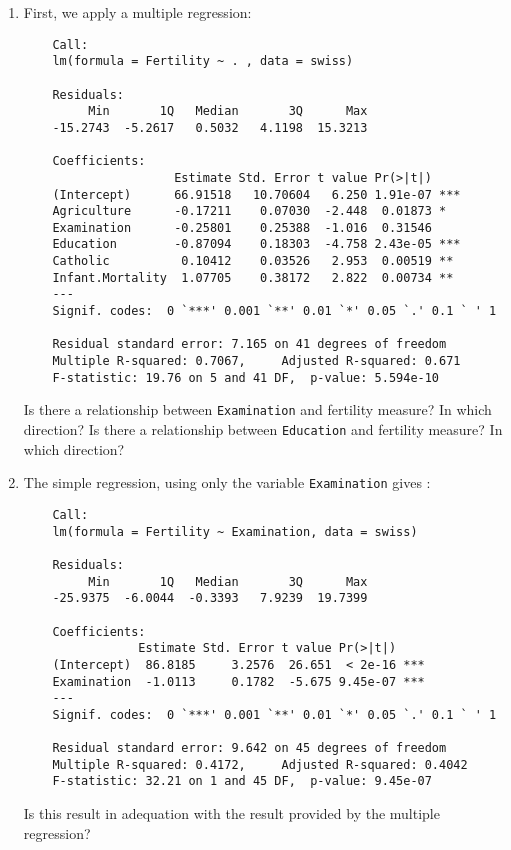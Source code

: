 \documentclass[12pt]{article}
\begin{document}
\begin{enumerate}

\item First, we apply a multiple regression: 

	\begin{verbatim}
	Call:
	lm(formula = Fertility ~ . , data = swiss)
	
	Residuals:
	     Min       1Q   Median       3Q      Max 
	-15.2743  -5.2617   0.5032   4.1198  15.3213 
	
	Coefficients:
	                 Estimate Std. Error t value Pr(>|t|)    
	(Intercept)      66.91518   10.70604   6.250 1.91e-07 ***
	Agriculture      -0.17211    0.07030  -2.448  0.01873 *  
	Examination      -0.25801    0.25388  -1.016  0.31546    
	Education        -0.87094    0.18303  -4.758 2.43e-05 ***
	Catholic          0.10412    0.03526   2.953  0.00519 ** 
	Infant.Mortality  1.07705    0.38172   2.822  0.00734 ** 
	---
	Signif. codes:  0 `***' 0.001 `**' 0.01 `*' 0.05 `.' 0.1 ` ' 1 
	
	Residual standard error: 7.165 on 41 degrees of freedom
	Multiple R-squared: 0.7067,     Adjusted R-squared: 0.671 
	F-statistic: 19.76 on 5 and 41 DF,  p-value: 5.594e-10
	\end{verbatim}
	

	
Is there a relationship between \texttt{Examination} and  fertility measure? In which direction?
Is there a relationship between \texttt{Education} and  fertility measure? In which direction?


\item The simple regression, using only the variable  \texttt{Examination} gives :

	\begin{verbatim}
	Call:
	lm(formula = Fertility ~ Examination, data = swiss)
	
	Residuals:
	     Min       1Q   Median       3Q      Max 
	-25.9375  -6.0044  -0.3393   7.9239  19.7399 
	
	Coefficients:
	            Estimate Std. Error t value Pr(>|t|)    
	(Intercept)  86.8185     3.2576  26.651  < 2e-16 ***
	Examination  -1.0113     0.1782  -5.675 9.45e-07 ***
	---
	Signif. codes:  0 `***' 0.001 `**' 0.01 `*' 0.05 `.' 0.1 ` ' 1 
	
	Residual standard error: 9.642 on 45 degrees of freedom
	Multiple R-squared: 0.4172,     Adjusted R-squared: 0.4042 
	F-statistic: 32.21 on 1 and 45 DF,  p-value: 9.45e-07 
	\end{verbatim}
	
Is this result in adequation with the result provided by the multiple regression?

\end{enumerate}
\end{document}
